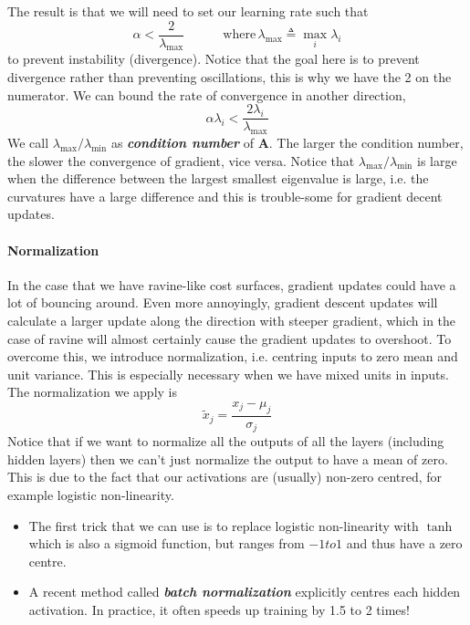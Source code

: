 \documentclass[11pt]{article}
\begin{document}
The result is that we will need to set our learning rate such that
\begin{equation}
    \alpha < \frac{2}{\lambda_{\max}} \quad\quad\quad \text{where}\, \lambda_{\max} \triangleq \max_i \lambda_i
\end{equation}
to prevent instability (divergence). Notice that the goal here is to prevent divergence rather than preventing oscillations, this is why we have the 2 on the numerator. We can bound the rate of convergence in another direction, 
\begin{equation}
    \alpha \lambda_{i}<\frac{2 \lambda_{i}}{\lambda_{\max }}
\end{equation}
We call $\lambda_{\max} / \lambda_{\min}$ as \textit{\textbf{condition number}} of $\mathbf{A}$. The larger the condition number, the slower the convergence of gradient, vice versa. Notice that $\lambda_{\max} / \lambda_{\min}$ is large when the difference between the largest smallest eigenvalue is large, i.e. the curvatures have a large difference and this is trouble-some for gradient decent updates. 

\paragraph{Normalization} In the case that we have ravine-like cost surfaces, gradient updates could have a lot of bouncing around. Even more annoyingly, gradient descent updates will calculate a larger update along the direction with steeper gradient, which in the case of ravine will almost certainly cause the gradient updates to overshoot. To overcome this, we introduce normalization, i.e. centring inputs to zero mean and unit variance. This is especially necessary when we have mixed units in inputs. The normalization we apply is
\begin{equation}
    \tilde{x}_{j}=\frac{x_{j}-\mu_{j}}{\sigma_{j}}
\end{equation}
Notice that if we want to normalize all the outputs of all the layers (including hidden layers) then we can't just normalize the output to have a mean of zero. This is due to the fact that our activations are (usually) non-zero centred, for example logistic non-linearity.
\begin{itemize}
    \item The first trick that we can use is to replace logistic non-linearity with $\tanh$ which is also a sigmoid function, but ranges from $-1 to 1$ and thus have a zero centre. 
    \item A recent method called \textit{\textbf{batch normalization}} explicitly centres each hidden activation. In practice, it often speeds up training by 1.5 to 2 times!
\end{itemize}
\end{document}
